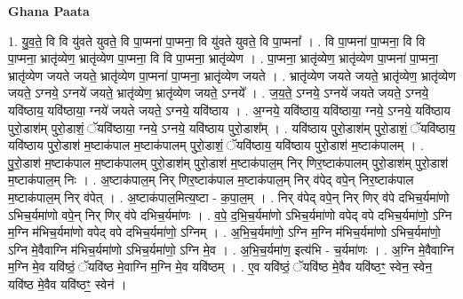 \documentclass[17pt]{extarticle}
\begin{document}
\textbf{Ghana Paata } \newline

1. यु॒व॒ते॒ वि वि यु॑वते युवते॒ वि पा॒प्मना॑ पा॒प्मना॒ वि यु॑वते युवते॒ वि पा॒प्मना᳚ । . वि पा॒प्मना॑ पा॒प्मना॒ वि वि पा॒प्मना॒ भ्रातृ॑व्येण॒ भ्रातृ॑व्येण पा॒प्मना॒ वि वि पा॒प्मना॒ भ्रातृ॑व्येण । . पा॒प्मना॒ भ्रातृ॑व्येण॒ भ्रातृ॑व्येण पा॒प्मना॑ पा॒प्मना॒ भ्रातृ॑व्येण जयते जयते॒ भ्रातृ॑व्येण पा॒प्मना॑ पा॒प्मना॒ भ्रातृ॑व्येण जयते । . भ्रातृ॑व्येण जयते जयते॒ भ्रातृ॑व्येण॒ भ्रातृ॑व्येण जयते॒ ऽग्नये॒ ऽग्नये॑ जयते॒ भ्रातृ॑व्येण॒ भ्रातृ॑व्येण जयते॒ ऽग्नये᳚ । . ज॒य॒ते॒ ऽग्नये॒ ऽग्नये॑ जयते जयते॒ ऽग्नये॒ यवि॑ष्ठाय॒ यवि॑ष्ठाया॒ ग्नये॑ जयते जयते॒ ऽग्नये॒ यवि॑ष्ठाय । . अ॒ग्नये॒ यवि॑ष्ठाय॒ यवि॑ष्ठाया॒ ग्नये॒ ऽग्नये॒ यवि॑ष्ठाय पुरो॒डाश॑म् पुरो॒डाशं॒ ॅयवि॑ष्ठाया॒ ग्नये॒ ऽग्नये॒ यवि॑ष्ठाय पुरो॒डाश᳚म् । . यवि॑ष्ठाय पुरो॒डाश॑म् पुरो॒डाशं॒ ॅयवि॑ष्ठाय॒ यवि॑ष्ठाय पुरो॒डाश॑ म॒ष्टाक॑पाल म॒ष्टाक॑पालम् पुरो॒डाशं॒ ॅयवि॑ष्ठाय॒ यवि॑ष्ठाय पुरो॒डाश॑ म॒ष्टाक॑पालम् । . पु॒रो॒डाश॑ म॒ष्टाक॑पाल म॒ष्टाक॑पालम् पुरो॒डाश॑म् पुरो॒डाश॑ म॒ष्टाक॑पाल॒म् निर् णिर॒ष्टाक॑पालम् पुरो॒डाश॑म् पुरो॒डाश॑ म॒ष्टाक॑पाल॒म् निः । . अ॒ष्टाक॑पाल॒म् निर् णिर॒ष्टाक॑पाल म॒ष्टाक॑पाल॒म् निर् व॑पेद् वपे॒न् निर॒ष्टाक॑पाल म॒ष्टाक॑पाल॒म् निर् व॑पेत् । . अ॒ष्टाक॑पाल॒मित्य॒ष्टा - क॒पा॒ल॒म् । . निर् व॑पेद् वपे॒न् निर् णिर् व॑पे दभिच॒र्यमा॑णो ऽभिच॒र्यमा॑णो वपे॒न् निर् णिर् व॑पे दभिच॒र्यमा॑णः । . व॒पे॒ द॒भि॒च॒र्यमा॑णो ऽभिच॒र्यमा॑णो वपेद् वपे दभिच॒र्यमा॑णो॒ ऽग्नि म॒ग्नि म॑भिच॒र्यमा॑णो वपेद् वपे दभिच॒र्यमा॑णो॒ ऽग्निम् । . अ॒भि॒च॒र्यमा॑णो॒ ऽग्नि म॒ग्नि म॑भिच॒र्यमा॑णो ऽभिच॒र्यमा॑णो॒ ऽग्नि मे॒वैवाग्नि म॑भिच॒र्यमा॑णो ऽभिच॒र्यमा॑णो॒ ऽग्नि मे॒व । . अ॒भि॒च॒र्यमा॑ण॒ इत्य॑भि - च॒र्यमा॑णः । . अ॒ग्नि मे॒वैवाग्नि म॒ग्नि मे॒व यवि॑ष्ठं॒ ॅयवि॑ष्ठ मे॒वाग्नि म॒ग्नि मे॒व यवि॑ष्ठम् । . ए॒व यवि॑ष्ठं॒ ॅयवि॑ष्ठ मे॒वैव यवि॑ष्ठꣳ॒॒ स्वेन॒ स्वेन॒ यवि॑ष्ठ मे॒वैव यवि॑ष्ठꣳ॒॒ स्वेन॑ । \newline
\end{document}
